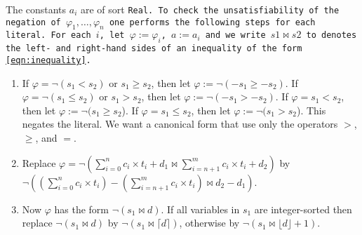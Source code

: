 The constants $a_i$ are of sort \tt{Real}. To check the unsatisfiability of the negation of $\varphi_1, \dots, \varphi_n$ one performs the following steps for each literal. For each $i$, let $\varphi := \varphi_i$, $a := a_i$ and
we write $s1 \bowtie s2$ to denotes the left- and right-hand sides of an inequality of the form \eqref{eqn:inequality}.

\begin{enumerate}
    \item If $\varphi =  \neg (s_1 < s_2)$  or $s_1 \geq s_2$, then let $\varphi := \neg(- s_1 \geq - s_2)$.
    If $\varphi =  \neg (s_1 \leq s_2)$ or $s_1 > s_2$, then let $\varphi := \neg(- s_1 > - s_2)$.
    If $\varphi = s_1 < s_2$, then let $\varphi := \neg(s_1 \geq s_2$).
    If $\varphi = s_1 \leq s_2$, then let $\varphi := \neg(s_1 > s_2$).
    This negates the literal. We want a canonical form that use only the operators $>$, $\geq$, and $=$.

    

    \item Replace $\varphi = \neg (\sum_{i=0}^{n}c_i\times{}t_i + d_1 \bowtie \sum_{i=n+1}^{m} c_i\times{}t_i + d_2)$ by $\neg (\left(\sum_{i=0}^{n}c_i\times{}t_i\right) - \left(\sum_{i=n+1}^{m} c_i\times{}t_i\right)
    \bowtie d_2 - d_1)$.
    
    \item \label{la_generic:str}Now $\varphi$ has the form $\neg (s_1 \bowtie d)$. If all
    variables in $s_1$ are integer-sorted then replace $\neg (s_1 \bowtie d)$ by $\neg (s_1 \bowtie \lceil d \rceil)$,
    otherwise by $\neg (s_1 \bowtie \lfloor d\rfloor + 1)$.



\end{enumerate}
